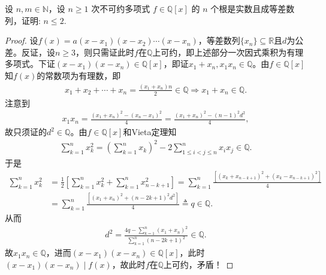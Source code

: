 \documentclass[../../main.tex]{subfiles}
\begin{document}
\begin{example}
设 \( n,m \in \mathbb{N} \)，设 \( n \geqslant 1 \) 次不可约多项式 \( f \in \mathbb{Q}[x] \) 的 \( n \) 个根是实数且成等差数列，证明: \( n \leqslant 2 \).
\end{example}
\begin{proof}
设$f(x)=a(x-x_1)(x-x_2)\cdots(x-x_n)$，等差数列$\{x_n\}\subseteq\mathbb{R}$且$d$为公差。反证，设$n\geqslant 3$，则只需证此时$f$在$\mathbb{Q}$上可约，即上述部分一次因式乘积为有理多项式。下证$(x-x_1)(x-x_n)\in\mathbb{Q}[x]$，即证$x_1+x_n,x_1x_n\in\mathbb{Q}$。由$f\in\mathbb{Q}[x]$知$f(x)$的常数项为有理数，即
\begin{align*}
x_1+x_2+\cdots+x_n=\frac{(x_1+x_n)n}{2}\in\mathbb{Q}\Longrightarrow x_1+x_n\in\mathbb{Q}.
\end{align*}
注意到
\begin{align*}
x_1x_n=\frac{(x_1+x_n)^2-(x_n-x_1)^2}{4}=\frac{(x_1+x_n)^2-(n-1)^2d^2}{4},
\end{align*}
故只须证的$d^2\in\mathbb{Q}$。由$f\in\mathbb{Q}[x]$和Vieta定理知
\begin{align*}
\sum_{k=1}^n x_k^2=\left(\sum_{k=1}^n x_k\right)^2-2\sum_{1\leqslant i<j\leqslant n}^n x_ix_j\in\mathbb{Q}.
\end{align*}
于是
\begin{align*}
\sum_{k=1}^n x_k^2&=\frac{1}{2}\left[\sum_{k=1}^n x_k^2+\sum_{k=1}^n x_{n-k+1}^2\right]=\sum_{k=1}^n \frac{\left[(x_k+x_{n-k+1})^2+(x_k-x_{n-k+1})^2\right]}{4}\\
&=\sum_{k=1}^n \frac{\left[(x_1+x_n)^2+(n-2k+1)^2d^2\right]}{4}\triangleq q\in\mathbb{Q}.
\end{align*}
从而
\begin{align*}
d^2=\frac{4q-\sum\limits_{k=1}^n (x_1+x_n)^2}{\sum\limits_{k=1}^n (n-2k+1)^2}\in\mathbb{Q}.
\end{align*}
故$x_1x_n\in\mathbb{Q}$，进而$(x-x_1)(x-x_n)\in\mathbb{Q}[x]$，此时$(x-x_1)(x-x_n)\mid f(x)$，故此时$f$在$\mathbb{Q}$上可约，矛盾！
\end{proof}
\end{document}
